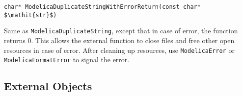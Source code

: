 \begin{functiondefinition}[ModelicaDuplicateStringWithErrorReturn]
\begin{synopsis}[C]\begin{lstlisting}
char* ModelicaDuplicateStringWithErrorReturn(const char* $\mathit{str}$)
\end{lstlisting}\end{synopsis}
\begin{semantics}
Same as \lstinline[language=C]!ModelicaDuplicateString!, except that in case of error, the function returns 0.
This allows the external function to close files and free other open resources in case of error.
After cleaning up resources, use \lstinline[language=C]!ModelicaError! or \lstinline[language=C]!ModelicaFormatError! to signal the error.
\end{semantics}
\end{functiondefinition}

\subsection{External Objects}\label{external-objects}

